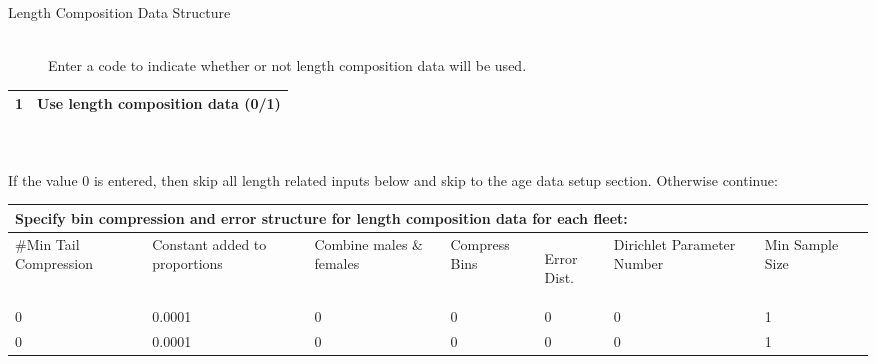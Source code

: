 \begin{description}
	\item[Length Composition Data Structure]\
		{\\Enter a code to indicate whether or not length composition data will be used.}
\end{description}

\begin{tabular}{p{2cm} p{13cm}}
		\hline	
		1 & Use length composition data (0/1)\\
		\hline									  
\end{tabular}
\\\\If the value 0 is entered, then skip all length related inputs below and skip to the age data setup section.  Otherwise continue:\\
	

\begin{tabular}{p{2cm} p{2cm} p{2cm} p{1.75cm} p{1cm} p{2cm} p{2cm} p{2cm}}
		\multicolumn{7}{l}{Specify bin compression and error structure for length composition data for each fleet:}\\
		\hline
		\#Min Tail Compression & Constant added to proportions & Combine males \& females & Compress Bins & \hypertarget{Dirichlet}{Error Dist.} & Dirichlet Parameter Number & Min Sample Size\\
		\hline
		0 & 0.0001 & 0 & 0 & 0 & 0 & 1 \\
		0 & 0.0001 & 0 & 0 & 0 & 0 & 1 \\
		\hline
\end{tabular}


